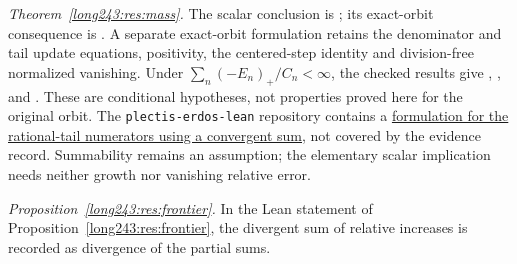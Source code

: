 \noindent\emph{Theorem~\ref{long243:res:mass}.} \noindent The scalar conclusion is
;
its exact-orbit consequence is
.
A separate exact-orbit formulation retains the denominator and tail update
equations, positivity, the centered-step identity and division-free normalized
vanishing. Under $\sum_n(-E_n)_+/C_n<\infty$, the checked results give
,
, and
.
These are conditional hypotheses, not properties proved here for the original
orbit.
The \texttt{plectis-erdos-lean} repository contains a
\href{https://github.com/wcook04/plectis-erdos-lean/blob/52f29ad173b04e3bac941b3663f2b9aebe5de0bb/ErdosProblems/Erdos243/PaperCompleteR8/CanonicalNegativeMass.lean\#L19}{formulation for the rational-tail numerators using a convergent sum},
not covered by the evidence record. Summability remains
an assumption; the elementary scalar implication needs neither growth nor
vanishing relative error.

\noindent\emph{Proposition~\ref{long243:res:frontier}.} \noindent In the Lean statement of Proposition~\ref{long243:res:frontier},
the divergent sum of relative increases is recorded as divergence of the
partial sums.

\iffalse

